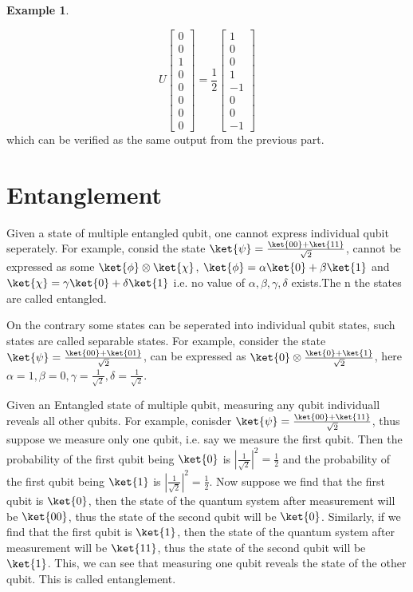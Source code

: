 \documentclass[12pt, oneside]{book}
\theoremstyle{definition}
\theoremstyle{definition}
\newtheorem{example}{Example}[section]
\theoremstyle{remark}
\begin{document}
\begin{example}
\begin{enumerate}
        \[
            U\begin{bmatrix} 0 \\ 0 \\ 1 \\ 0 \\ 0 \\ 0 \\ 0 \\ 0 \end{bmatrix}=\frac{1}{2}\begin{bmatrix} 1 \\ 0 \\ 0 \\ 1 \\ -1 \\ 0 \\ 0 \\ -1 \end{bmatrix}
        \]
        which can be verified as the same output from the previous part.
    \end{enumerate}
\end{example}

\chapter{Entanglement}
Given a state of multiple entangled qubit, one cannot express individual qubit seperately.
For example, consid the state $\ket{\psi} = \frac{\ket{00}+\ket{11}}{\sqrt{2}}$, cannot be expressed as some $\ket{\phi} \otimes \ket{\chi}$,
$\ket{\phi}=\alpha \ket{0} + \beta \ket{1}$ and $\ket{\chi}=\gamma \ket{0} + \delta \ket{1}$ i.e. no value of $\alpha, \beta, \gamma, \delta$ exists.The
n the states are called entangled.

On the contrary some states can be seperated into individual qubit states, such states are called separable states.
For example, consider the state $\ket{\psi} = \frac{\ket{00}+\ket{01}}{\sqrt{2}}$, can be expressed as $\ket{0} \otimes \frac{\ket{0}+\ket{1}}{\sqrt{2}}$, here
$\alpha =1 ,\beta =0,\gamma = \frac{1}{\sqrt{2}},\delta = \frac{1}{\sqrt{2}}$.

Given an Entangled state of multiple qubit, measuring any qubit individuall reveals all other qubits. 
For example, conisder $\ket{\psi}=\frac{\ket{00}+\ket{11}}{\sqrt{2}}$, thus suppose we measure only one qubit, i.e.
say we measure the first qubit. Then the probability of the first qubit being $\ket{0}$ is $|\frac{1}{\sqrt{2}}|^2=\frac{1}{2}$ and the probability of the first qubit being $\ket{1}$ is $|\frac{1}{\sqrt{2}}|^2=\frac{1}{2}$.
Now suppose we find that the first qubit is $\ket{0}$, then the state of the quantum system after measurement will be $\ket{00}$, thus the state of the second qubit will be $\ket{0}$.
Similarly, if we find that the first qubit is $\ket{1}$, then the state of the quantum system after measurement will be $\ket{11}$, thus the state of the second qubit will be $\ket{1}$.
This, we can see that measuring one qubit reveals the state of the other qubit. This is called entanglement.
\end{document}

